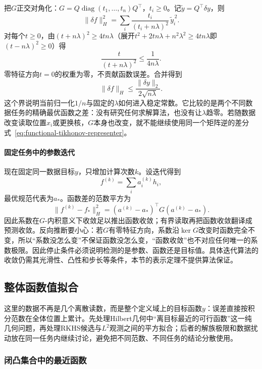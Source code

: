 把$G$正交对角化：$G=Q\operatorname{diag}(t_1,\ldots,t_n)Q^{\top}$，$t_i\ge0$。记$\tilde y=Q^{\top}\delta y$，则
\[
  \|\delta f\|_H^2
  =\sum_i\frac{t_i}{(t_i+n\lambda)^2}\,\tilde y_i^{\,2}.
\]
对每个$t\ge0$，由$(t+n\lambda)^2\ge4tn\lambda$（展开$t^2+2tn\lambda+n^2\lambda^2\ge4tn\lambda$即$(t-n\lambda)^2\ge0$）得
\[
  \frac{t}{(t+n\lambda)^2}\le\frac{1}{4n\lambda}.
\]
零特征方向$t=0$的权重为零，不贡献函数误差。合并得到
\begin{equation}
  \|\delta f\|_H\le\frac{\|\delta y\|_2}{2\sqrt{n\lambda}}.
  \label{eq:functional-data-stability-bound}
\end{equation}
这个界说明当前归一化$1/n$与固定的$\lambda$如何进入稳定常数。它比较的是两个不同数据任务的精确最优函数之差：没有研究任何求解算法，也没有让$\lambda$趋零。若随数据改变读取位置$x_i$或更换核，$G$本身也改变，就不能继续使用同一个矩阵逆的差分式~\eqref{eq:functional-tikhonov-representer}。

\paragraph{固定任务中的参数迭代}

现在固定同一数据目标$y$，只增加计算次数$k$。设迭代得到
\[
  f^{(k)}=\sum_i a_i^{(k)}h_i,
\]
最优规范代表为$a_*$。函数差的范数平方为
\[
  \|f^{(k)}-f_*\|_H^2
  =(a^{(k)}-a_*)^{\top}G(a^{(k)}-a_*).
\]
因此系数在$G$-内积意义下收敛足以推出函数收敛；有界读取再把函数收敛翻译成预测收敛。反向推断要小心：若$G$有零特征方向，系数沿$\ker G$改变时函数完全不变，所以“系数没怎么变”不保证函数没怎么变，“函数收敛”也不对应任何唯一的系数极限。因此停止条件必须说明检测的是参数、函数还是目标值。具体迭代算法的收敛仍需其光滑性、凸性和步长等条件，本节的表示定理不提供算法保证。

\subsection{整体函数值拟合}
\label{subsubsec:integral-error-fitting}

这里的数据不再是几个离散读数，而是整个定义域上的目标函数$y$：误差直接按积分范数在全体位置上累计。先处理Hilbert几何中“离目标最近的可行函数”这一纯几何问题，再处理RKHS候选与$L^2$观测之间的平方拟合；后者的解族极限和数据扰动放在同一任务内继续讨论，避免把不同范数、不同任务的结论分散使用。

\subsubsection{闭凸集合中的最近函数}
\label{subsubsec:nearest-closed-convex}

